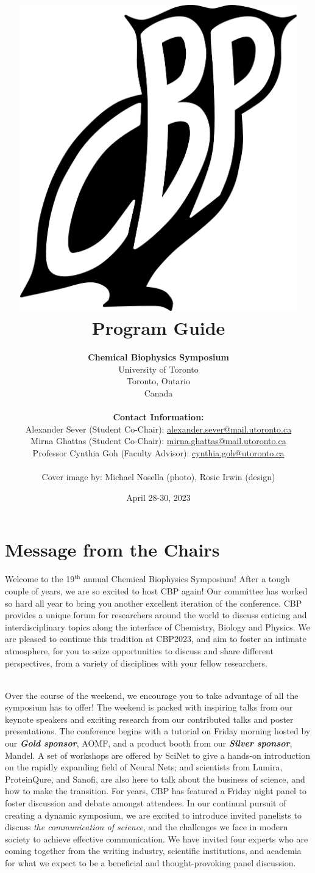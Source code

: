 \documentclass[titlepage,oneside,openany,10pt]{book}
\title{
    \includegraphics[width=12cm,keepaspectratio]
    {Other_Figures/owl_bw.png}\\
    \vspace{2cm}
    Program Guide}
\author{
    \textbf{Chemical Biophysics Symposium}\\
    University of Toronto\\
    Toronto, Ontario\\
    Canada\\\\
    
    \textbf{Contact Information:}\\
    Alexander Sever (Student Co-Chair): 
    \underline{alexander.sever@mail.utoronto.ca} \\
    Mirna Ghattas (Student Co-Chair): 
    \underline{mirna.ghattas@mail.utoronto.ca}\\
    Professor Cynthia Goh (Faculty Advisor): 
    \underline{cynthia.goh@utoronto.ca}\\\\
    Cover image by: Michael Nosella (photo), Rosie Irwin (design)}
\date{April 28-30, 2023}
\begin{document}
\maketitle
\frontmatter

\hypertarget{contents}{}
\renewcommand\contentsname{Table of Contents}
\tableofcontents  

  
\chapter*{Message from the Chairs}
\label{chapter:message_from_the_chair}
{}

\vspace{1cm}
Welcome to the 19$^{\textrm{th}}$ annual Chemical Biophysics Symposium!  After a tough couple of years, we are so excited to host CBP again! Our committee has worked so hard all year to bring you another excellent iteration of the conference. CBP provides a unique forum for researchers around the world to discuss enticing and interdisciplinary topics along the interface of Chemistry, Biology and Physics. We are pleased to continue this tradition at CBP2023, and aim to foster an intimate atmosphere, for you to seize opportunities to discuss and share different perspectives, from a variety of disciplines with your fellow researchers.\\\

Over the course of the weekend, we encourage you to take advantage of all the symposium has to offer! The weekend is packed with inspiring talks from our keynote speakers and exciting research from our contributed talks and poster presentations. The conference begins with a tutorial on Friday morning hosted by our \textbf{\textit{Gold sponsor}}, AOMF, and a product booth from our \textbf{\textit{Silver sponsor}}, Mandel. A set of workshops are offered by SciNet to give a hands-on introduction on the rapidly expanding field of Neural Nets; and scientists from Lumira, ProteinQure, and Sanofi, are also here to talk about the business of science, and how to make the transition. For years, CBP has featured a Friday night panel to foster discussion and debate amongst attendees. In our continual pursuit of creating a dynamic symposium, we are excited to introduce invited panelists to discuss \textit{the communication of science}, and the challenges we face in modern society to achieve effective communication. We have invited four experts who are coming together from the writing industry, scientific institutions, and academia for what we expect to be a beneficial and thought-provoking panel discussion.\\\
\end{document}
